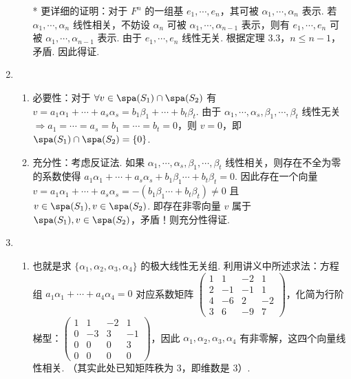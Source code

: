 \begin{enumerate}
\begin{enumerate}
        * 更详细的证明：对于 $F^n$ 的一组基 $e_1,\cdots,e_n$，其可被 $\alpha_1,\cdots,\alpha_n$ 表示. 若 $\alpha_1,\cdots,\alpha_n$ 线性相关，不妨设 $\alpha_n$ 可被 $\alpha_1,\cdots,\alpha_{n-1}$ 表示，则有 $e_1,\cdots,e_n$ 可被 $\alpha_1,\cdots,\alpha_{n-1}$ 表示. 由于 $e_1,\cdots,e_n$ 线性无关. 根据定理 3.3，$n\le n-1$，矛盾. 因此得证.
    \end{enumerate}
    \item \begin{enumerate}
        \item 必要性：对于 $\forall v\in\spa(S_1)\cap\spa(S_2)$ 有 $v=a_1\alpha_1+\cdots+a_s\alpha_s=b_1\beta_1+\cdots+b_t\beta_t$. 由于 $\alpha_1,\cdots,\alpha_s,\beta_1,\cdots,\beta_t$ 线性无关 $\Rightarrow a_1=\cdots=a_s=b_1=\cdots=b_t=0$，则 $v=0$，即 $\spa(S_1)\cap\spa(S_2)=\{0\}$.
        \item 充分性：考虑反证法. 如果 $\alpha_1,\cdots,\alpha_s,\beta_1,\cdots,\beta_t$ 线性相关，则存在不全为零的系数使得 $a_1\alpha_1+\cdots+a_s\alpha_s+b_1\beta_1\cdots+b_t\beta_t=0$. 因此存在一个向量 $v=a_1\alpha_1+\cdots+a_s\alpha_s=-(b_1\beta_1\cdots+b_t\beta_t)\ne 0$ 且 $v\in\spa(S_1),v\in\spa(S_2)$. 即存在非零向量 $v$ 属于 $\spa(S_1),v\in\spa(S_2)$，矛盾！则充分性得证.
    \end{enumerate}
    \item \begin{enumerate}
        \item 也就是求 $\{\alpha_1,\alpha_2,\alpha_3,\alpha_4\}$ 的极大线性无关组. 利用讲义中所述求法：方程组 $a_1\alpha_1+\cdots+a_4\alpha_4=0$ 对应系数矩阵 $\begin{pmatrix}
            1 & 1 & -2 & 1\\
            2 & -1 & -1& 1\\
            4 & -6 & 2 & -2\\
            3 & 6 & -9&7\end{pmatrix}$，化简为行阶梯型：$\begin{pmatrix}
            1 & 1 & -2 & 1\\
            0 & -3 & 3& -1\\
            0 & 0 & 0 & 3\\
            0 & 0 & 0&0\end{pmatrix}$，因此 $\alpha_1,\alpha_2,\alpha_3,\alpha_4$ 有非零解，这四个向量线性相关. （其实此处已知矩阵秩为 $3$，即维数是 $3$）.


\end{enumerate}
\end{enumerate}

